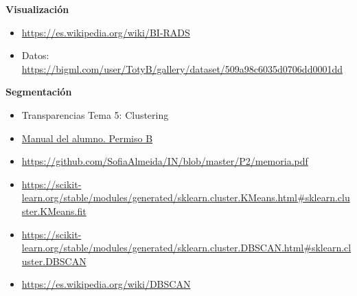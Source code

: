 \documentclass[a4]{article}
\begin{document}
\textbf{Visualización}
\begin{itemize}
\item \href{https://es.wikipedia.org/wiki/BI-RADS}{https://es.wikipedia.org/wiki/BI-RADS}
\item Datos: \href{https://bigml.com/user/TotyB/gallery/dataset/509a98c6035d0706dd0001dd}{https://bigml.com/user/TotyB/gallery/dataset/509a98c6035d0706dd0001dd}
\end{itemize}
\textbf{Segmentación}
\begin{itemize}
\item Transparencias Tema 5: Clustering
\item \href{https://www.todostuslibros.com/libros/manual-del-alumno-permiso-b-facilauto_978-84-09-08551-4}{Manual del alumno. Permiso B}
\item \href{https://github.com/SofiaAlmeida/IN/blob/master/P2/memoria.pdf}{https://github.com/SofiaAlmeida/IN/blob/master/P2/memoria.pdf}
\item \href{https://scikit-learn.org/stable/modules/generated/sklearn.cluster.KMeans.html\#sklearn.cluster.KMeans.fit}{https://scikit-learn.org/stable/modules/generated/sklearn.cluster.KMeans.html\#sklearn.cluster.KMeans.fit}
\item \href{https://scikit-learn.org/stable/modules/generated/sklearn.cluster.DBSCAN.html\#sklearn.cluster.DBSCAN}{https://scikit-learn.org/stable/modules/generated/sklearn.cluster.DBSCAN.html\#sklearn.cluster.DBSCAN}
\item \href{https://es.wikipedia.org/wiki/DBSCAN}{https://es.wikipedia.org/wiki/DBSCAN}
\end{itemize}
\end{document}
